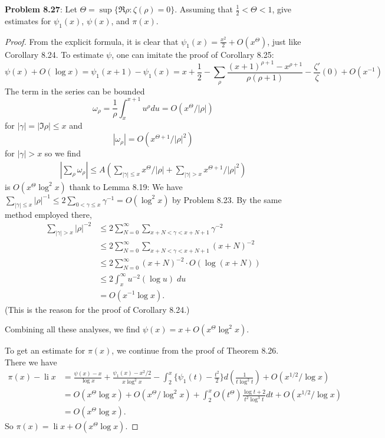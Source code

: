 \documentclass[12pt]{article}
\DeclareMathOperator{\li}{li}
\begin{document}
\textbf{Problem 8.27}: Let $\Theta = \sup\{\Re \rho : \zeta(\rho) = 0\}$. Assuming that $\frac12 < \Theta < 1$, give estimates for $\psi_1(x)$, $\psi(x)$, and $\pi(x)$.

\begin{proof}
From the explicit formula, it is clear that $\psi_1(x) = \frac{x^2}{2} + O(x^{\Theta})$, just like Corollary 8.24. To estimate $\psi$, one can imitate the proof of Corollary 8.25:
$$\psi(x) + O(\log x) = \psi_1(x + 1) - \psi_1(x) = x + \frac12 - \sum_\rho \frac{(x+1)^{\rho + 1} - x^{\rho + 1}}{\rho (\rho + 1)} - \frac{\zeta'}{\zeta}(0) + O(x^{-1})$$
The term in the series can be bounded
$$\omega_\rho = \frac{1}{\rho} \int_x^{x+1} u^\rho du = O(x^\Theta / |\rho|)$$
for $|\gamma| = |\Im \rho| \leq x$ and
$$|\omega_\rho| = O(x^{\Theta + 1} / |\rho|^2)$$
for $|\gamma| > x$ so we find
\begin{align*}
|\sum_\rho \omega_\rho| \leq A \left( \sum_{|\gamma| \leq x} x^\Theta / |\rho| + \sum_{|\gamma| > x} x^{\Theta + 1} / |\rho|^2 \right)
\end{align*}
is $O(x^\Theta \log^2 x)$ thank to Lemma 8.19: We have $\sum_{|\gamma| \leq x} |\rho|^{-1} \leq 2 \sum_{0 < \gamma \leq x} \gamma^{-1} = O(\log^2 x)$ by Problem 8.23. By the same method employed there,
\begin{align*}
\sum_{|\gamma| > x} |\rho|^{-2} &\leq 2 \sum_{N = 0}^{\infty} \sum_{x + N < \gamma < x + N + 1} \gamma^{-2}\\
&\leq 2 \sum_{N = 0}^{\infty} \sum_{x + N < \gamma < x + N + 1} (x + N)^{-2}\\
&\leq 2 \sum_{N = 0}^{\infty} (x + N)^{-2} \cdot O(\log(x + N))\\
&\leq 2 \int_x^\infty u^{-2} (\log u) \; du\\
&= O(x^{-1} \log x).
\end{align*}
(This is the reason for the proof of Corollary 8.24.)

Combining all these analyses, we find $\psi(x) = x + O(x^\Theta \log^2 x)$.

To get an estimate for $\pi(x)$, we continue from the proof of Theorem 8.26. There we have
\begin{align*}
\pi(x) - \li x &= \frac{\psi(x) - x}{\log x} + \frac{\psi_1(x) - x^2/2}{x \log^2 x} - \int_2^x \{\psi_1(t) - \frac{t^2}{2}\} d(\frac{1}{t \log^2 t}) + O(x^{1/2} / \log x)\\
&= O(x^\Theta \log x) + O(x^\Theta / \log^2 x) + \int_2^x O(t^\Theta) \frac{\log t + 2}{t^2 \log^3 t} dt + O(x^{1/2} / \log x)\\
&= O(x^\Theta \log x).
\end{align*}
So $\pi(x) = \li x + O(x^\Theta \log x)$.
\end{proof}

\unless\ifdefined\IsMainDocument
\end{document}
